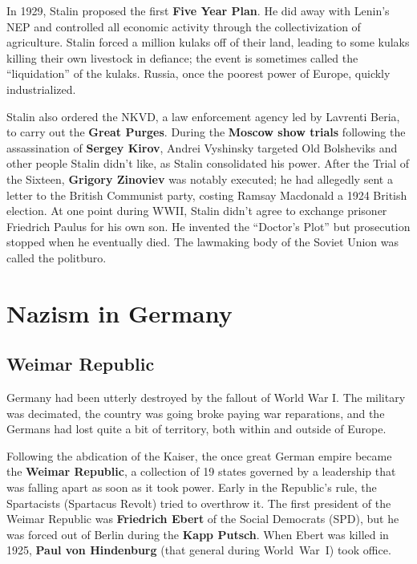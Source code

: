 In 1929, Stalin proposed the first \textbf{Five Year Plan}.
He did away with Lenin's NEP and controlled all economic activity through the collectivization of agriculture.
Stalin forced a million kulaks off of their land, leading to some kulaks killing their own livestock in defiance;
the event is sometimes called the ``liquidation'' of the kulaks.
Russia, once the poorest power of Europe, quickly industrialized.

Stalin also ordered the NKVD, a law enforcement agency led by Lavrenti Beria,
to carry out the \textbf{Great Purges}.
During the \textbf{Moscow show trials} following the assassination of \textbf{Sergey Kirov},
Andrei Vyshinsky targeted Old Bolsheviks and other people Stalin didn't like, as Stalin consolidated his power.
After the Trial of the Sixteen, \textbf{Grigory Zinoviev} was notably executed;
he had allegedly sent a letter to the British Communist party, costing Ramsay Macdonald a 1924 British election.
At one point during WWII, Stalin didn't agree to exchange prisoner Friedrich Paulus for his own son.
He invented the ``Doctor's Plot'' but prosecution stopped when he eventually died.
The lawmaking body of the Soviet Union was called the politburo.

\section{Nazism in Germany}

\subsection*{Weimar Republic}

Germany had been utterly destroyed by the fallout of World War I\@.
The military was decimated, the country was going broke paying war reparations,
and the Germans had lost quite a bit of territory, both within and outside of Europe.

Following the abdication of the Kaiser,
the once great German empire became the \textbf{Weimar Republic},
a collection of 19 states governed by a leadership that was falling apart as soon as it took power.
Early in the Republic's rule, the Spartacists (Spartacus Revolt) tried to overthrow it.
The first president of the Weimar Republic was \textbf{Friedrich Ebert} of the Social Democrats (SPD),
but he was forced out of Berlin during the \textbf{Kapp Putsch}.
When Ebert was killed in 1925,
\textbf{Paul von Hindenburg} (that general during World~War~I) took office.

